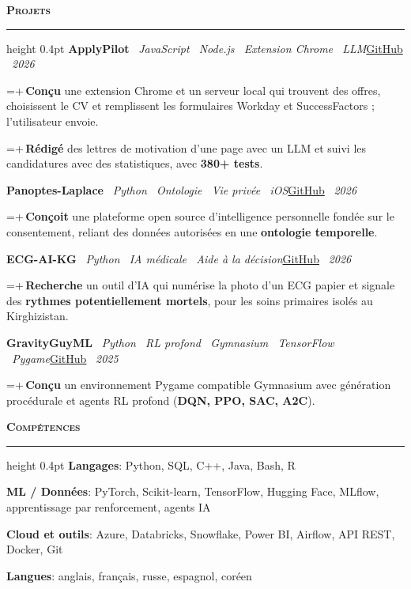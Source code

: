 \documentclass[letterpaper,11pt]{article}
\newcommand{\sep}{\textbar\ }
\newlength{\cvindent}\setlength{\cvindent}{7pt}
\newcommand{\cvsection}[1]{\vspace{9pt}\noindent\textbf{\textsc{#1}}\par\nointerlineskip\vspace{3pt}\hrule height 0.4pt\vspace{7pt}}
\newcommand{\cvrow}[2]{\noindent\hspace{\cvindent}#1\hfill #2\par}
\newlength{\cvbw}
\newcommand{\cvb}[1]{{\fontsize{9.5}{11.4}\selectfont\settowidth{\cvbw}{\textbullet\,}\hangindent=\dimexpr2\cvindent+\cvbw\relax\hangafter=1\noindent\hspace{2\cvindent}\textbullet\,#1\par}}
\newcommand{\cvgap}{\vspace{4pt}}
\begin{document}
\cvsection{Projets}
\cvrow{\textbf{ApplyPilot} \sep \textit{JavaScript \textemdash\ Node.js \textemdash\ Extension Chrome \textemdash\ LLM}}{\href{https://github.com/Mbaka11/ApplyPilot}{GitHub} \sep \textit{2026}}
\cvb{\textbf{Conçu} une extension Chrome et un serveur local qui trouvent des offres, choisissent le CV et remplissent les formulaires Workday et SuccessFactors ; l'utilisateur envoie.}
\cvb{\textbf{Rédigé} des lettres de motivation d'une page avec un LLM et suivi les candidatures avec des statistiques, avec \textbf{380+ tests}.}
\cvgap
\cvrow{\textbf{Panoptes-Laplace} \sep \textit{Python \textemdash\ Ontologie \textemdash\ Vie privée \textemdash\ iOS}}{\href{https://github.com/Mbaka11/Panoptes-Laplace}{GitHub} \sep \textit{2026}}
\cvb{\textbf{Conçoit} une plateforme open source d'intelligence personnelle fondée sur le consentement, reliant des données autorisées en une \textbf{ontologie temporelle}.}
\cvgap
\cvrow{\textbf{ECG-AI-KG} \sep \textit{Python \textemdash\ IA médicale \textemdash\ Aide à la décision}}{\href{https://github.com/Mbaka11/ECG-AI-KG}{GitHub} \sep \textit{2026}}
\cvb{\textbf{Recherche} un outil d'IA qui numérise la photo d'un ECG papier et signale des \textbf{rythmes potentiellement mortels}, pour les soins primaires isolés au Kirghizistan.}
\cvgap
\cvrow{\textbf{GravityGuyML} \sep \textit{Python \textemdash\ RL profond \textemdash\ Gymnasium \textemdash\ TensorFlow \textemdash\ Pygame}}{\href{https://github.com/Mbaka11/Gravity-Guy-ML}{GitHub} \sep \textit{2025}}
\cvb{\textbf{Conçu} un environnement Pygame compatible Gymnasium avec génération procédurale et agents RL profond (\textbf{DQN, PPO, SAC, A2C}).}
\cvgap

\cvsection{Compétences}
\hspace{\cvindent}\textbf{Langages}: Python, SQL, C++, Java, Bash, R\par
\hspace{\cvindent}\textbf{ML / Données}: PyTorch, Scikit-learn, TensorFlow, Hugging Face, MLflow, apprentissage par renforcement, agents IA\par
\hspace{\cvindent}\textbf{Cloud et outils}: Azure, Databricks, Snowflake, Power BI, Airflow, API REST, Docker, Git\par
\hspace{\cvindent}\textbf{Langues}: anglais, français, russe, espagnol, coréen\par
\end{document}
